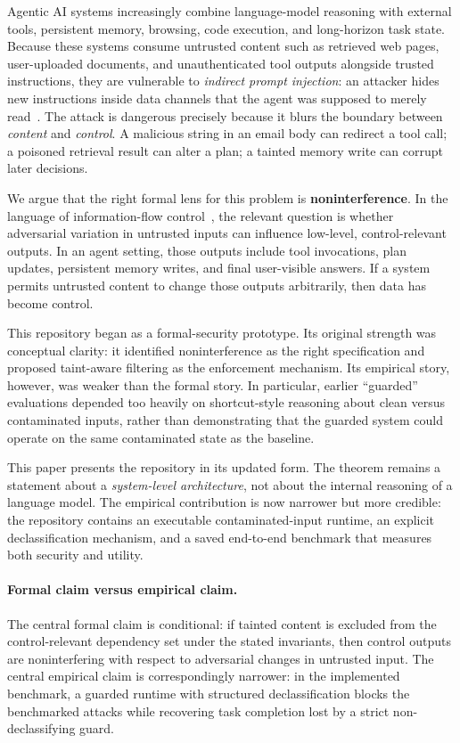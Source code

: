 \documentclass[11pt]{article}
\begin{document}
Agentic AI systems increasingly combine language-model reasoning with external
tools, persistent memory, browsing, code execution, and long-horizon task
state. Because these systems consume untrusted content such as retrieved web
pages, user-uploaded documents, and unauthenticated tool outputs alongside
trusted instructions, they are vulnerable to \emph{indirect prompt injection}:
an attacker hides new instructions inside data channels that the agent was
supposed to merely read~\cite{greshake2023,crowdstrike2025,esecplanet2025}.
The attack is dangerous precisely because it blurs the boundary between
\emph{content} and \emph{control}. A malicious string in an email body can
redirect a tool call; a poisoned retrieval result can alter a plan; a tainted
memory write can corrupt later decisions.

We argue that the right formal lens for this problem is
\textbf{noninterference}. In the language of information-flow
control~\cite{goguen1982}, the relevant question is whether adversarial
variation in untrusted inputs can influence low-level, control-relevant outputs.
In an agent setting, those outputs include tool invocations, plan updates,
persistent memory writes, and final user-visible answers. If a system permits
untrusted content to change those outputs arbitrarily, then data has become
control.

This repository began as a formal-security prototype. Its original strength was
conceptual clarity: it identified noninterference as the right specification
and proposed taint-aware filtering as the enforcement mechanism. Its empirical
story, however, was weaker than the formal story. In particular, earlier
``guarded'' evaluations depended too heavily on shortcut-style reasoning about
clean versus contaminated inputs, rather than demonstrating that the guarded
system could operate on the same contaminated state as the baseline.

This paper presents the repository in its updated form. The theorem remains a
statement about a \emph{system-level architecture}, not about the internal
reasoning of a language model. The empirical contribution is now narrower but
more credible: the repository contains an executable contaminated-input runtime,
an explicit declassification mechanism, and a saved end-to-end benchmark that
measures both security and utility.

\paragraph{Formal claim versus empirical claim.}
The central formal claim is conditional: if tainted content is excluded from the
control-relevant dependency set under the stated invariants, then control
outputs are noninterfering with respect to adversarial changes in untrusted
input. The central empirical claim is correspondingly narrower: in the
implemented benchmark, a guarded runtime with structured declassification blocks
the benchmarked attacks while recovering task completion lost by a strict
non-declassifying guard.
\end{document}
